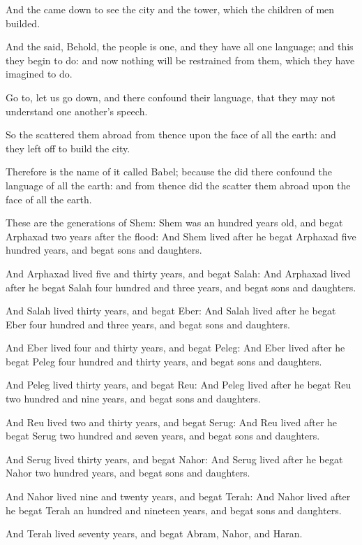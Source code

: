 \verse And the \LORD came down to see the city and the tower, which the children of men builded.

\verse And the \LORD said, Behold, the people is one, and they have all one language; and this they begin to do: and now nothing will be restrained from them, which they have imagined to do.

\verse Go to, let us go down, and there confound their language, that they may not understand one another's speech.

\verse So the \LORD scattered them abroad from thence upon the face of all the earth: and they left off to build the city.

\verse Therefore is the name of it called Babel; because the \LORD did there confound the language of all the earth: and from thence did the \LORD scatter them abroad upon the face of all the earth.

\verse These are the generations of Shem: Shem was an hundred years old, and begat Arphaxad two years after the flood: \verse And Shem lived after he begat Arphaxad five hundred years, and begat sons and daughters.

\verse And Arphaxad lived five and thirty years, and begat Salah: \verse And Arphaxad lived after he begat Salah four hundred and three years, and begat sons and daughters.

\verse And Salah lived thirty years, and begat Eber: \verse And Salah lived after he begat Eber four hundred and three years, and begat sons and daughters.

\verse And Eber lived four and thirty years, and begat Peleg: \verse And Eber lived after he begat Peleg four hundred and thirty years, and begat sons and daughters.

\verse And Peleg lived thirty years, and begat Reu: \verse And Peleg lived after he begat Reu two hundred and nine years, and begat sons and daughters.

\verse And Reu lived two and thirty years, and begat Serug: \verse And Reu lived after he begat Serug two hundred and seven years, and begat sons and daughters.

\verse And Serug lived thirty years, and begat Nahor: \verse And Serug lived after he begat Nahor two hundred years, and begat sons and daughters.

\verse And Nahor lived nine and twenty years, and begat Terah: \verse And Nahor lived after he begat Terah an hundred and nineteen years, and begat sons and daughters.

\verse And Terah lived seventy years, and begat Abram, Nahor, and Haran.

